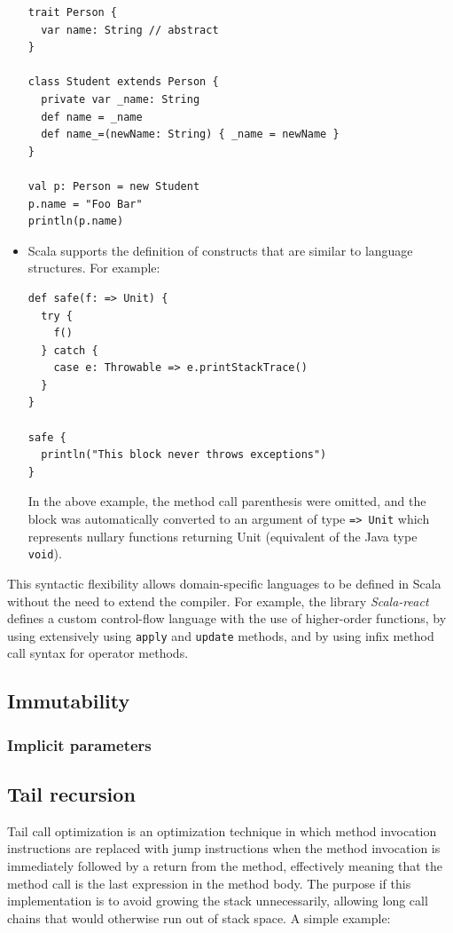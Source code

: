 \begin{itemize}
\begin{lstlisting}
trait Person {
  var name: String // abstract
}

class Student extends Person {
  private var _name: String
  def name = _name
  def name_=(newName: String) { _name = newName }
}

val p: Person = new Student
p.name = "Foo Bar"
println(p.name)
\end{lstlisting}

\item Scala supports the definition of constructs that are similar to language structures. For example:
\begin{lstlisting}
def safe(f: => Unit) {
  try {
    f()
  } catch {
    case e: Throwable => e.printStackTrace()
  }
}

safe {
  println("This block never throws exceptions")
}
\end{lstlisting}

In the above example, the method call parenthesis were omitted, and the block was automatically converted to an argument of type \texttt{=> Unit} which represents nullary functions returning Unit (equivalent of the Java type \texttt{void}).

\end{itemize}

This syntactic flexibility allows domain-specific languages to be defined in Scala without the need to extend the compiler. For example, the library \emph{Scala-react} defines a custom control-flow language with the use of higher-order functions, by using extensively using \texttt{apply} and \texttt{update} methods, and by using infix method call syntax for operator methods.

\subsection{Immutability}

\subsubsection{Implicit parameters}

\subsection{Tail recursion}

Tail call optimization is an optimization technique in which method invocation instructions are replaced with jump instructions when the method invocation is immediately followed by a return from the method, effectively meaning that the method call is the last expression in the method body. The purpose if this implementation is to avoid growing the stack unnecessarily, allowing long call chains that would otherwise run out of stack space. A simple example:

